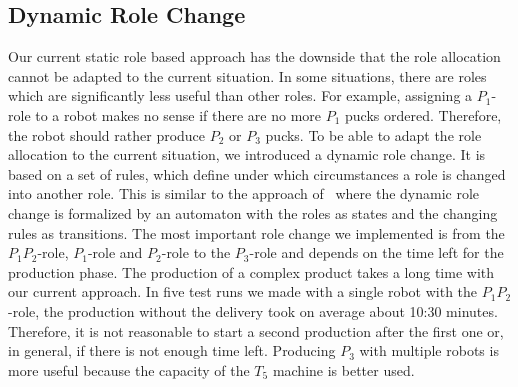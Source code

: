 \subsection{Dynamic Role Change}
Our current static role based approach has the downside that the role allocation cannot be adapted to the current situation. In some situations, there are roles which are significantly less useful than other roles. For example, assigning a $P_1$-role to a robot makes no sense if there are no more $P_1$ pucks ordered. Therefore, the robot should rather produce $P_2$ or $P_3$ pucks. To be able to adapt the role allocation to the current situation, we introduced a dynamic role change. It is based on a set of rules, which define under which circumstances a role is changed into another role. This is similar to the approach of~\cite{dynamic_role_assignment} where the dynamic role change is formalized by an automaton with the roles as states and the changing rules as transitions. The most important role change we implemented is from the $P_1P_2$-role, $P_1$-role and $P_2$-role to the $P_3$-role and depends on the time left for the production phase. The production of a complex product takes a long time with our current approach. In five test runs we made with a single robot with the $P_1P_2$-role, the production without the delivery took on average about 10:30 minutes. Therefore, it is not reasonable to start a second production after the first one or, in general, if there is not enough time left. Producing $P_3$ with multiple robots is more useful because the capacity of the $T_5$ machine is better used.
